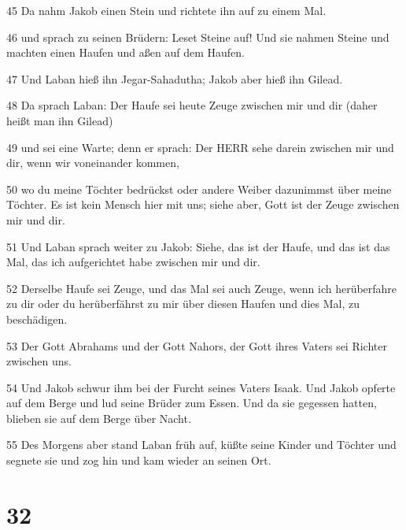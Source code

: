 \par 45 Da nahm Jakob einen Stein und richtete ihn auf zu einem Mal.
\par 46 und sprach zu seinen Brüdern: Leset Steine auf! Und sie nahmen Steine und machten einen Haufen und aßen auf dem Haufen.
\par 47 Und Laban hieß ihn Jegar-Sahadutha; Jakob aber hieß ihn Gilead.
\par 48 Da sprach Laban: Der Haufe sei heute Zeuge zwischen mir und dir (daher heißt man ihn Gilead)
\par 49 und sei eine Warte; denn er sprach: Der HERR sehe darein zwischen mir und dir, wenn wir voneinander kommen,
\par 50 wo du meine Töchter bedrückst oder andere Weiber dazunimmst über meine Töchter. Es ist kein Mensch hier mit uns; siehe aber, Gott ist der Zeuge zwischen mir und dir.
\par 51 Und Laban sprach weiter zu Jakob: Siehe, das ist der Haufe, und das ist das Mal, das ich aufgerichtet habe zwischen mir und dir.
\par 52 Derselbe Haufe sei Zeuge, und das Mal sei auch Zeuge, wenn ich herüberfahre zu dir oder du herüberfährst zu mir über diesen Haufen und dies Mal, zu beschädigen.
\par 53 Der Gott Abrahams und der Gott Nahors, der Gott ihres Vaters sei Richter zwischen uns.
\par 54 Und Jakob schwur ihm bei der Furcht seines Vaters Isaak. Und Jakob opferte auf dem Berge und lud seine Brüder zum Essen. Und da sie gegessen hatten, blieben sie auf dem Berge über Nacht.
\par 55 Des Morgens aber stand Laban früh auf, küßte seine Kinder und Töchter und segnete sie und zog hin und kam wieder an seinen Ort.

\chapter{32}

